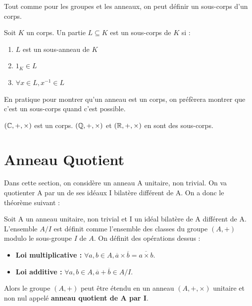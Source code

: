 Tout comme pour les groupes et les anneaux, on peut définir un sous-corps d'un corps. 

\begin{definition}
    Soit $K$ un corps. Un partie $L \subseteq K$ est un sous-corps de $K$ si :
    \begin{enumerate}[label=\roman*)]
        \item $L$ est un sous-anneau de $K$
        \item $1_K \in L$ 
        \item $ \forall x \in L, x^{-1} \in L$
    \end{enumerate}
\end{definition}

En pratique pour montrer qu'un anneau est un corps, on préfèrera montrer que c'est un sous-corps quand c'est possible. 

\begin{example}
    $(\mathbb{C},+,\times)$ est un corps. $(\mathbb{Q},+,\times)$ et $(\mathbb{R},+,\times)$ en sont des sous-corps. 
\end{example}


\section{Anneau Quotient}

Dans cette section, on considère un anneau A unitaire, non trivial. 
On va quotienter A par un de ses idéaux I bilatère différent de A. 
On a donc le théorème suivant : 

\begin{theorem}
    Soit A un anneau unitaire, non trivial et I un idéal bilatère de A différent de A. 
    L'ensemble $A/I$ est définit comme l'ensemble des classes du groupe $(A,+)$ modulo le 
    sous-groupe $I$ de $A$. On définit des opérations dessus : 
    \begin{itemize}
        \item \textbf{Loi multiplicative : } $ \forall a, b \in A, \overline{a} \times \overline{b} = \overline{a \times b}$. 
        \item \textbf{Loi additive : } $ \forall a,b \in A, \overline{a} + \overline{b} \in A/I$. 
    \end{itemize}
    Alors le groupe $(A,+)$ peut être étendu en un anneau $(A,+,\times)$ unitaire et non nul appelé 
    \textbf{anneau quotient de A par I}. 
\end{theorem}

